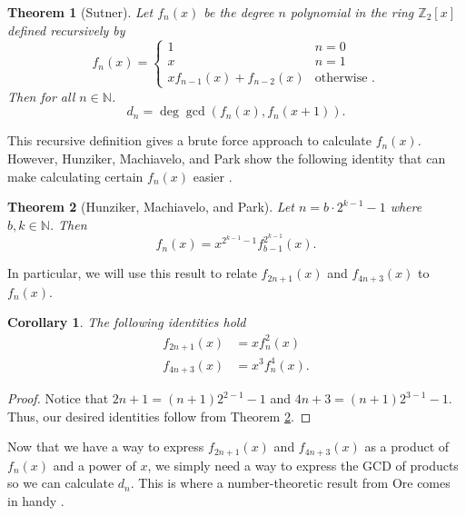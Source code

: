 \documentclass[a4paper]{article}
\newtheorem{theorem}{Theorem}
\newtheorem{corollary}{Corollary}
\newcommand{\Z}{\mathbb{Z}}
\newcommand{\N}{\mathbb{N}}
\begin{document}
	\begin{theorem}[Sutner]\label{Sutner_gcd}
		Let $f_n(x)$ be the degree $n$ polynomial in the ring $\Z_2[x]$ defined recursively by
		\begin{equation*}
			f_n(x) = \begin{cases}
				1 & n=0 \\
				x & n=1 \\
				xf_{n-1}(x) + f_{n-2}(x) & \text{otherwise }.
			\end{cases}
		\end{equation*}
		Then for all $n \in \N$.
		\begin{equation*}
			d_n = \deg{\gcd\left(f_{n}(x), f_{n}(x+1)\right)}.
		\end{equation*}
	\end{theorem}

	This recursive definition gives a brute force approach to calculate $f_n(x)$.
	However, Hunziker, Machiavelo, and Park show the following identity that can make calculating certain $f_n(x)$ easier \cite{HUNZIKER2004465}.
	
	\begin{theorem}[Hunziker, Machiavelo, and Park]\label{HMP_identity}
		Let $n = b\cdot2^{k-1} - 1$ where $b, k \in \N$.
		Then
		\begin{equation*}
			f_n(x) = x^{2^{k-1}-1} f_{b-1}^{2^{k-1}}(x).
		\end{equation*}
	\end{theorem}

	In particular, we will use this result to relate $f_{2n+1}(x)$ and $f_{4n+3}(x)$ to $f_n(x)$.
	\begin{corollary}\label{cor1}
		The following identities hold
		\begin{align*}
			f_{2n+1}(x) &= xf_{n}^2(x) \\
			f_{4n+3}(x) &= x^3f_{n}^4(x).
		\end{align*}
	\end{corollary}
	\begin{proof}
		Notice that $2n+1 = (n+1)2^{2-1} - 1$ and $4n+3 = (n+1)2^{3-1} - 1$.
		Thus, our desired identities follow from Theorem \ref{HMP_identity}.
	\end{proof}

	Now that we have a way to express $f_{2n+1}(x)$ and $f_{4n+3}(x)$ as a product of $f_{n}(x)$ and a power of $x$, we simply need a way to express the GCD of products so we can calculate $d_n$.
	This is where a number-theoretic result from Ore comes in handy \cite{ore_number_theory}.
	
\end{document}
